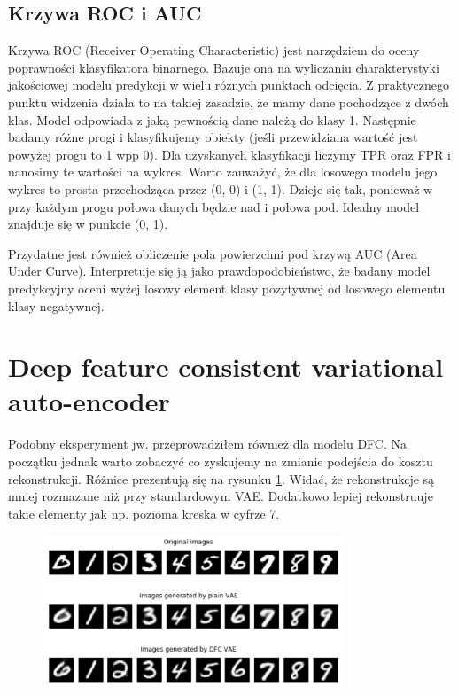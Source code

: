 \subsection{Krzywa ROC i AUC}

Krzywa ROC (Receiver Operating Characteristic) jest narzędziem do oceny poprawności klasyfikatora binarnego. Bazuje ona na wyliczaniu charakterystyki jakościowej modelu predykcji w wielu różnych punktach odcięcia. Z praktycznego punktu widzenia działa to na takiej zasadzie, że mamy dane pochodzące z dwóch klas. Model odpowiada z jaką pewnością dane należą do klasy 1. Następnie badamy różne progi i klasyfikujemy obiekty (jeśli przewidziana wartość jest powyżej progu to 1 wpp 0). Dla uzyskanych klasyfikacji liczymy TPR oraz FPR i nanosimy te wartości na wykres. Warto zauważyć, że dla losowego modelu jego wykres to prosta przechodząca przez (0, 0) i (1, 1). Dzieje się tak, ponieważ w przy każdym progu połowa danych będzie nad i połowa pod. Idealny model znajduje się w punkcie (0, 1).

Przydatne jest również obliczenie pola powierzchni pod krzywą AUC (Area Under Curve). Interpretuje się ją jako prawdopodobieństwo, że badany model predykcyjny oceni wyżej losowy element klasy pozytywnej od losowego elementu klasy negatywnej.

\section{Deep feature consistent variational auto-encoder}

Podobny eksperyment jw. przeprowadziłem również dla modelu DFC. Na początku jednak warto zobaczyć co zyskujemy na zmianie podejścia do kosztu rekonstrukcji. Różnice prezentują się na rysunku \ref{fig:vae_dfc_recon}. Widać, że rekonstrukcje są mniej rozmazane niż przy standardowym VAE. Dodatkowo lepiej rekonstruuje takie elementy jak np. pozioma kreska w cyfrze 7. 

\begin{figure}[h!]
    \centering
    \includegraphics[width=0.8\textwidth]{images/vae_dfc_gen}
    \caption{}
    \label{fig:vae_dfc_recon}
\end{figure}

